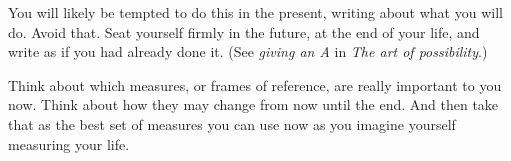 You will likely be tempted to do this in the present, writing about what you will do. Avoid that. Seat yourself firmly in the future, at the end of your life, and write as if you had already done it. (See \emph{giving an A} in \emph{The art of possibility}\cite{zander-art}.)


Think about which measures, or frames of reference, are really important to you now. Think about how they may change from now until the end. And then take that as the best set of measures you can use now as you imagine yourself measuring your life.